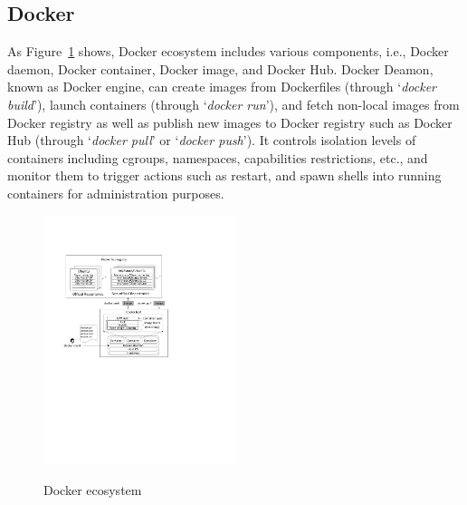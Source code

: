 \subsection{Docker}

As Figure~\ref{fig-docker-architecture} shows, Docker ecosystem includes various components, i.e., Docker daemon, Docker container, Docker image, and Docker Hub.
%
Docker Deamon, known as Docker engine, can create images from Dockerfiles (through `\textit{docker build}'), launch containers (through `\textit{docker run}'), and fetch non-local images from Docker registry as well as publish new images to Docker registry such as Docker Hub (through `\textit{docker pull}' or `\textit{docker push}').
%
It controls isolation levels of containers including cgroups, namespaces, capabilities restrictions, etc., and monitor them to trigger actions such as restart, and spawn shells into running containers for administration purposes.
%


\begin{figure}
	\centering
	\includegraphics[width=0.5\textwidth]{graphs/fig-docker-architecture}\\
	\caption{Docker ecosystem}\label{fig-docker-architecture}
\end{figure}


